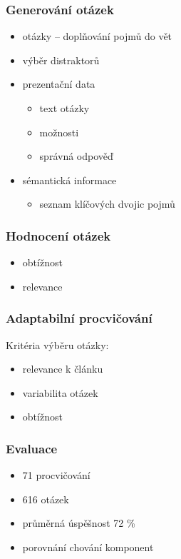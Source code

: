 \documentclass[xcolor=svgnames]{beamer}
\begin{document}
\begin{frame}
\frametitle{Generování otázek}
\begin{itemize}
\item otázky -- doplňování pojmů do vět
\item výběr distraktorů
\item prezentační data
  \begin{itemize}
  \item text otázky
  \item možnosti
  \item správná odpověď
  \end{itemize}
\item sémantická informace
  \begin{itemize}
  \item seznam klíčových dvojic pojmů
  \end{itemize}
\end{itemize}
\end{frame}
\begin{frame}
\frametitle{Hodnocení otázek}
\begin{itemize}
\item obtížnost
\item relevance
\end{itemize}
\end{frame}
\begin{frame}
\frametitle{Adaptabilní procvičování}
Kritéria výběru otázky:
\begin{itemize}
\item relevance k článku
\item variabilita otázek
\item obtížnost
\end{itemize}
\end{frame}
\begin{frame}
\frametitle{Evaluace}
\begin{itemize}
\item 71 procvičování
\item 616 otázek
\item průměrná úspěšnost 72 \%
\item porovnání chování komponent
\end{itemize}
\end{frame}
\end{document}
